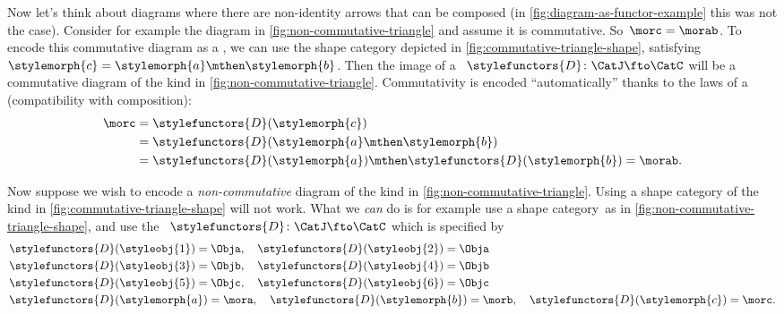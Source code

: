 Now let's think about diagrams where there are non-identity arrows that can be composed (in \cref{fig:diagram-as-functor-example} this was not the case).
Consider for example the diagram in \cref{fig:non-commutative-triangle} and assume it is commutative.
So~$\morc = \morab$.
To encode this commutative diagram as a , we can use the shape category depicted in \cref{fig:commutative-triangle-shape}, satisfying~$\stylemorph{c} = \stylemorph{a} \mthen \stylemorph{b}$.
Then the image of a ~$\stylefunctors{D}\colon \CatJ \fto \CatC$ will be a commutative diagram of the kind in \cref{fig:non-commutative-triangle}.
Commutativity is encoded ``automatically'' thanks to the laws of a  (compatibility with composition):
\begin{align}
    \morc & = \stylefunctors{D}(\stylemorph{c}) \\
          & = \stylefunctors{D}(\stylemorph{a} \mthen \stylemorph{b}) \\
          & = \stylefunctors{D}(\stylemorph{a}) \mthen \stylefunctors{D}(\stylemorph{b}) = \morab.
\end{align}

\begin{marginfigure}
    \centering
    \caption{}
    \label{fig:non-commutative-triangle-shape}
\end{marginfigure}

Now suppose we wish to encode a \emph{non-commutative} diagram of the kind in \cref{fig:non-commutative-triangle}.
Using a shape category of the kind in \cref{fig:commutative-triangle-shape} will not work.
What we \emph{can} do is for example use a shape category~\CatJ as in \cref{fig:non-commutative-triangle-shape}, and use the ~$\stylefunctors{D}\colon \CatJ \fto \CatC$ which is specified by
\begin{align}
     & \stylefunctors{D}(\styleobj{1}) = \Obja, \quad \stylefunctors{D}(\styleobj{2}) = \Obja \\
     & \stylefunctors{D}(\styleobj{3}) = \Objb, \quad \stylefunctors{D}(\styleobj{4}) = \Objb \\
     & \stylefunctors{D}(\styleobj{5}) = \Objc, \quad \stylefunctors{D}(\styleobj{6}) = \Objc \\
     & \stylefunctors{D}(\stylemorph{a}) = \mora, \quad \stylefunctors{D}(\stylemorph{b}) = \morb, \quad \stylefunctors{D}(\stylemorph{c}) = \morc.
\end{align}




